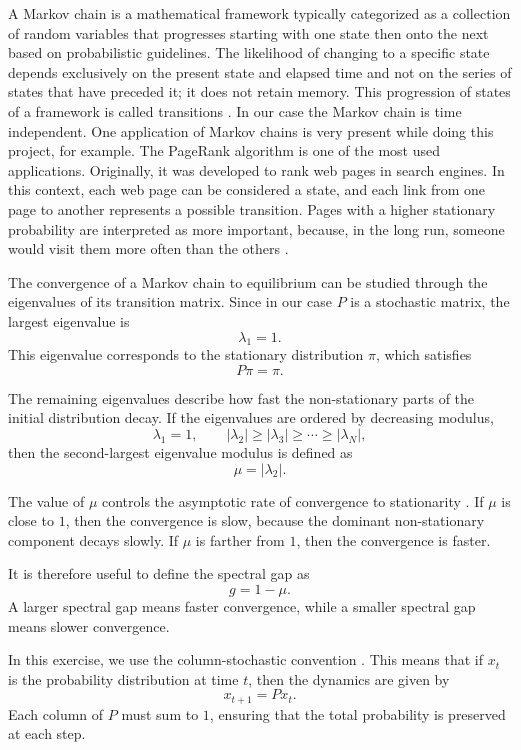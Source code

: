A Markov chain is a mathematical framework typically categorized as a collection of random variables that progresses starting with one state then onto the next based on probabilistic guidelines. The likelihood of changing to a specific state depends exclusively on the present state and elapsed time and not on the series of states that have preceded it; it does not retain memory. This progression of states of a framework is called transitions \cite{sciencedirect_markov_chain}. In our case the Markov chain is time independent. One application of Markov chains is very present while doing this project, for example. The PageRank algorithm is one of the most used applications.
Originally, it was developed to rank web pages in search engines. In this context, each web page can be considered a state, and each link from one page to another represents a possible transition. Pages with a higher stationary probability are interpreted as more important, because, in the long run, someone would visit them more often than the others \cite{roberts2016pagerank}.



The convergence of a Markov chain to equilibrium can be studied through the eigenvalues of its transition matrix. Since in our case \(P\) is a stochastic matrix, the largest eigenvalue is
\[
\lambda_1 = 1.
\]
This eigenvalue corresponds to the stationary distribution \(\pi\), which satisfies
\[
P\pi = \pi.
\]

The remaining eigenvalues describe how fast the non-stationary parts of the initial distribution decay. If the eigenvalues are ordered by decreasing modulus,
\[
\lambda_1 = 1, \qquad |\lambda_2| \geq |\lambda_3| \geq \cdots \geq |\lambda_N|,
\]
then the second-largest eigenvalue modulus is defined as 
\[
\mu = |\lambda_2|.
\]

The value of \(\mu\) controls the asymptotic rate of convergence to stationarity \cite{gade2009secondlargest}. If \(\mu\) is close to \(1\), then the convergence is slow, because the dominant non-stationary component decays slowly. If \(\mu\) is farther from \(1\), then the convergence is faster.

It is therefore useful to define the spectral gap as
\[
g = 1-\mu.
\]
A larger spectral gap means faster convergence, while a smaller spectral gap means slower convergence.

In this exercise, we use the column-stochastic convention \cite{backaker2012googlemarkovchain}. This means that if \(x_t\) is the probability distribution at time \(t\), then the dynamics are given by
\[
x_{t+1}=Px_t.
\]
Each column of \(P\) must sum to \(1\), ensuring that the total probability is preserved at each step.

